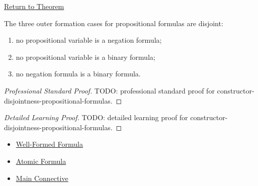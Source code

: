 \newpage
{}
\label{prf:constructor-disjointness-propositional-formulas}

\begin{remark*}[Return]
\hyperref[lem:constructor-disjointness-propositional-formulas]{Return to Theorem}
\end{remark*}

\begin{lemma*}
The three outer formation cases for propositional formulas are disjoint:
\begin{enumerate}
\item no propositional variable is a negation formula;
\item no propositional variable is a binary formula;
\item no negation formula is a binary formula.
\end{enumerate}
\end{lemma*}

\begin{proof}[Professional Standard Proof]
\LRAProofBodyStart
TODO: professional standard proof for constructor-disjointness-propositional-formulas.
\end{proof}

\begin{proof}[Detailed Learning Proof]
\LRAProofBodyStart
TODO: detailed learning proof for constructor-disjointness-propositional-formulas.
\end{proof}

\begin{remark*}
\end{remark*}

\begin{dependencies}
\begin{itemize}
  \item \hyperref[def:well-formed-formula]{Well-Formed Formula}
  \item \hyperref[def:atomic-formula-propositional-logic]{Atomic Formula}
  \item \hyperref[def:main-connective-propositional-logic]{Main Connective}
\end{itemize}
\end{dependencies}

\clearpage
